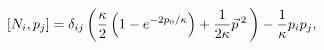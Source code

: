 \begin{equation}\label{2}
   \left[N_{i}, p_{j}\right] =   \delta_{ij}
 \left( {\kappa\over 2} \left(
 1 -e^{-2{p_{0}/ \kappa}}
\right) + {1\over 2\kappa} \vec{p}\,{}^{ 2}\, \right) -  {1\over \kappa}
p_{i}p_{j} ,
\end{equation}

